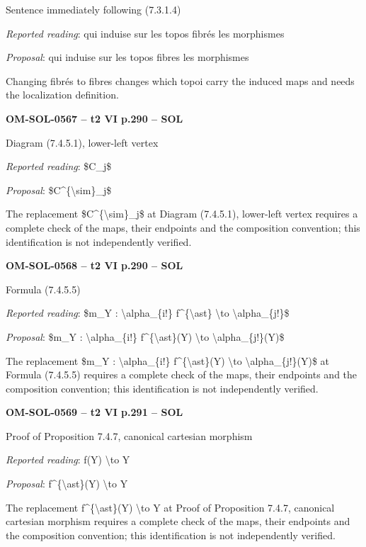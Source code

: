 Sentence immediately following (7.3.1.4)\par
\emph{Reported reading}: qui induise sur les topos fibrés les morphismes\par
\emph{Proposal}: qui induise sur les topos fibres les morphismes\par
Changing fibrés to fibres changes which topoi carry the induced maps and needs the localization definition.\par
\par\noindent\textbf{OM-SOL-0567 -- t2 VI p.290 -- SOL}\par
Diagram (7.4.5.1), lower-left vertex\par
\emph{Reported reading}: \$C\_j\$\par
\emph{Proposal}: \$C\textasciicircum{}\{\textbackslash{}sim\}\_j\$\par
The replacement \$C\textasciicircum{}\{\textbackslash{}sim\}\_j\$ at Diagram (7.4.5.1), lower-left vertex requires a complete check of the maps, their endpoints and the composition convention; this identification is not independently verified.\par
\par\noindent\textbf{OM-SOL-0568 -- t2 VI p.290 -- SOL}\par
Formula (7.4.5.5)\par
\emph{Reported reading}: \$m\_Y : \textbackslash{}alpha\_\{i!\} f\textasciicircum{}\{\textbackslash{}ast\} \textbackslash{}to \textbackslash{}alpha\_\{j!\}\$\par
\emph{Proposal}: \$m\_Y : \textbackslash{}alpha\_\{i!\} f\textasciicircum{}\{\textbackslash{}ast\}(Y) \textbackslash{}to \textbackslash{}alpha\_\{j!\}(Y)\$\par
The replacement \$m\_Y : \textbackslash{}alpha\_\{i!\} f\textasciicircum{}\{\textbackslash{}ast\}(Y) \textbackslash{}to \textbackslash{}alpha\_\{j!\}(Y)\$ at Formula (7.4.5.5) requires a complete check of the maps, their endpoints and the composition convention; this identification is not independently verified.\par
\par\noindent\textbf{OM-SOL-0569 -- t2 VI p.291 -- SOL}\par
Proof of Proposition 7.4.7, canonical cartesian morphism\par
\emph{Reported reading}: f(Y) \textbackslash{}to Y\par
\emph{Proposal}: f\textasciicircum{}\{\textbackslash{}ast\}(Y) \textbackslash{}to Y\par
The replacement f\textasciicircum{}\{\textbackslash{}ast\}(Y) \textbackslash{}to Y at Proof of Proposition 7.4.7, canonical cartesian morphism requires a complete check of the maps, their endpoints and the composition convention; this identification is not independently verified.\par
